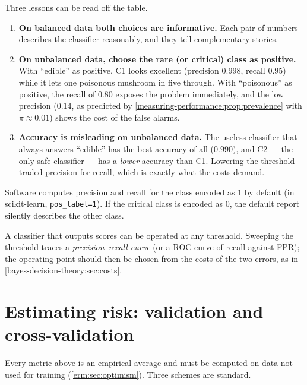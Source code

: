 \begin{notechapter}
Three lessons can be read off the table.
\begin{enumerate}
  \item \textbf{On balanced data both choices are informative.} Each pair of
        numbers describes the classifier reasonably, and they tell
        complementary stories.
  \item \textbf{On unbalanced data, choose the rare (or critical) class as
        positive.} With ``edible'' as positive, C1 looks excellent (precision
        $0.998$, recall $0.95$) while it lets one poisonous mushroom in five
        through. With ``poisonous'' as positive, the recall of $0.80$ exposes
        the problem immediately, and the low precision ($0.14$, as predicted by
        \cref{measuring-performance:prop:prevalence} with $\pi\approx0.01$)
        shows the cost of the false alarms.
  \item \textbf{Accuracy is misleading on unbalanced data.} The useless
        classifier that always answers ``edible'' has the best accuracy of all
        ($0.990$), and C2 --- the only safe classifier --- has a \emph{lower}
        accuracy than C1. Lowering the threshold traded precision for recall,
        which is exactly what the costs demand.
\end{enumerate}

\begin{pitfall}
Software computes precision and recall for the class encoded as $1$ by
default (in scikit-learn, \texttt{pos\_label=1}). If the critical class is
encoded as $0$, the default report silently describes the other class.
\end{pitfall}

A classifier that outputs scores can be operated at any threshold. Sweeping the
threshold traces a \emph{precision--recall curve} (or a ROC curve of recall
against FPR); the operating point should then be chosen from the costs of the
two errors, as in \cref{bayes-decision-theory:sec:costs}.

\section{Estimating risk: validation and cross-validation}\label{measuring-performance:sec:cv}

Every metric above is an empirical average and must be computed on data not
used for training (\cref{erm:sec:optimism}). Three schemes are standard.


\end{notechapter}
